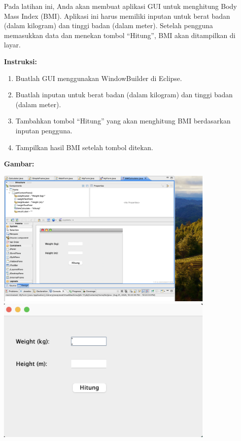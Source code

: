 Pada latihan ini, Anda akan membuat aplikasi GUI untuk menghitung Body Mass Index (BMI). Aplikasi ini harus memiliki inputan untuk berat badan (dalam kilogram) dan tinggi badan (dalam meter). Setelah pengguna memasukkan data dan menekan tombol “Hitung”, BMI akan ditampilkan di layar.

\textbf{Instruksi:}
\begin{enumerate}
	\item Buatlah GUI menggunakan WindowBuilder di Eclipse.
	\item Buatlah inputan untuk berat badan (dalam kilogram) dan tinggi badan (dalam meter).
	\item Tambahkan tombol “Hitung” yang akan menghitung BMI berdasarkan inputan pengguna.
	\item Tampilkan hasil BMI setelah tombol ditekan.
\end{enumerate}


\textbf{Gambar:} \\
\begin{center}
	\includegraphics[width=0.8\textwidth]{assets/pertemuan11/bmicalculator_window_builder.png}
	\includegraphics[width=0.8\textwidth]{assets/pertemuan11/bmicalculator.png}
\end{center}


